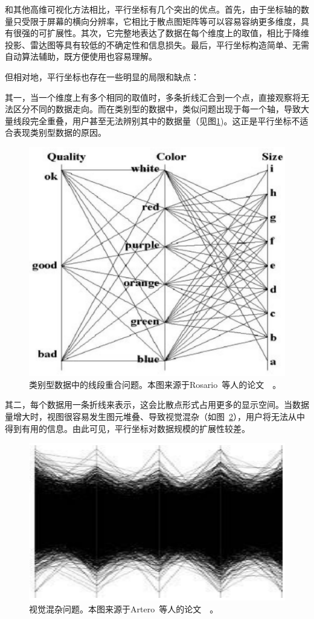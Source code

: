 \documentclass[12pt,twocolumn]{article}
\begin{document}
和其他高维可视化方法相比，平行坐标有几个突出的优点。首先，由于坐标轴的数量只受限于屏幕的横向分辨率，它相比于散点图矩阵等可以容易容纳更多维度，具有很强的可扩展性。其次，它完整地表达了数据在每个维度上的取值，相比于降维投影、雷达图等具有较低的不确定性和信息损失。最后，平行坐标构造简单、无需自动算法辅助，既方便使用也容易理解。

但相对地，平行坐标也存在一些明显的局限和缺点：

其一，当一个维度上有多个相同的取值时，多条折线汇合到一个点，直接观察将无法区分不同的数据走向。而在类别型的数据中，类似问题出现于每一个轴，导致大量线段完全重叠，用户甚至无法辨别其中的数据量（见图\ref{fig:PC_coincide})。这正是平行坐标不适合表现类别型数据的原因。

\begin{figure}[!htb]
\centering
\includegraphics[width=0.6\linewidth]{images/PC_coincide.eps}
\caption{\label{fig:PC_coincide}类别型数据中的线段重合问题。本图来源于Rosario~等人的论文~\citep{rosario2004mapping}~。
}
\end{figure}

其二，每个数据用一条折线来表示，这会比散点形式占用更多的显示空间。当数据量增大时，视图很容易发生图元堆叠、导致视觉混杂（如图~\ref{fig:PC_clutter}），用户将无法从中得到有用的信息。由此可见，平行坐标对数据规模的扩展性较差。

\begin{figure}[!htb]
\centering
\includegraphics[width=0.8\linewidth]{images/PC_clutter.eps}
\caption{\label{fig:PC_clutter}视觉混杂问题。本图来源于Artero~等人的论文~\citep{artero2004uncovering}~。
}
\end{figure}
\end{document}
